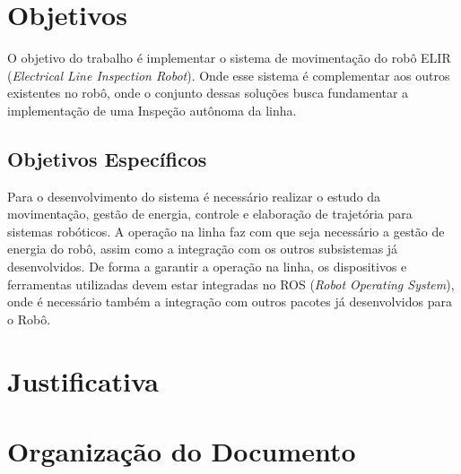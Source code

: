 \section{Objetivos}
\label{sec:obj}
O objetivo do trabalho é implementar o sistema de movimentação do robô ELIR (\textit{Electrical Line Inspection Robot}). Onde esse sistema é complementar aos outros existentes no robô, onde o conjunto dessas soluções busca fundamentar a implementação de uma Inspeção autônoma da linha.


\subsection{Objetivos Específicos}
\label{ssec:objesp}
Para o desenvolvimento do sistema é necessário realizar o estudo da movimentação, gestão de energia, controle e elaboração de trajetória para sistemas robóticos. A operação na linha faz com que seja necessário a gestão de energia do robô, assim como a integração com os outros subsistemas já desenvolvidos. De forma a garantir a operação na linha, os dispositivos e ferramentas utilizadas devem estar integradas no ROS (\textit{Robot Operating System}), onde é necessário também a integração com outros pacotes já desenvolvidos para o Robô.

\section{Justificativa}
\label{sec:justi}


\section{Organização do Documento}
\label{section:organizacao}
